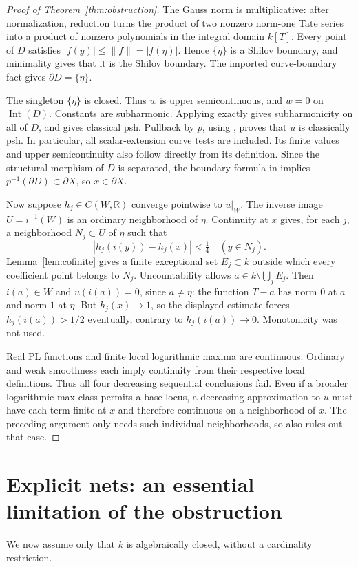 \documentclass[11pt]{article}
\newcommand{\Int}{\operatorname{Int}}
\begin{document}
\begin{proof}[Proof of Theorem~\ref{thm:obstruction}]
The Gauss norm is multiplicative: after normalization, reduction turns
the product of two nonzero norm-one Tate series into a product of nonzero
polynomials in the integral domain $k[T]$. Every point of $D$ satisfies
$|f(y)|\le\|f\|=|f(\eta)|$. Hence $\{\eta\}$ is a Shilov boundary,
and minimality gives that it is the Shilov boundary. The imported
curve-boundary fact gives $\partial D=\{\eta\}$.

The singleton $\{\eta\}$ is closed. Thus $w$ is upper semicontinuous,
and $w=0$ on $\Int(D)$. Constants are subharmonic. Applying exactly
\cite[Proposition~3.5(3)]{GR} gives subharmonicity on all of $D$, and
\cite[\S4.1.2]{GR} gives classical psh. Pullback by $p$, using
\cite[Proposition~4.2(6)]{GR}, proves that $u$ is classically psh. In
particular, all scalar-extension curve tests are included. Its finite
values and upper semicontinuity also follow directly from its definition.
Since the structural morphism of $D$ is separated, the boundary formula
in \cite[\S2.11(4)]{GR} implies $p^{-1}(\partial D)\subset\partial X$,
so $x\in\partial X$.

Now suppose $h_j\in C(W,\mathbb R)$ converge pointwise to $u|_W$.
The inverse image $U=i^{-1}(W)$ is an ordinary neighborhood of $\eta$.
Continuity at $x$ gives, for each $j$, a neighborhood $N_j\subset U$
of $\eta$ such that
\[
|h_j(i(y))-h_j(x)|<\tfrac14\quad(y\in N_j).
\]
Lemma~\ref{lem:cofinite} gives a finite exceptional set $E_j\subset k$
outside which every coefficient point belongs to $N_j$. Uncountability
allows $a\in k\setminus\bigcup_jE_j$. Then $i(a)\in W$ and
$u(i(a))=0$, since $a\ne\eta$: the function $T-a$ has norm $0$ at
$a$ and norm $1$ at $\eta$. But $h_j(x)\to1$, so the displayed estimate
forces $h_j(i(a))>1/2$ eventually, contrary to $h_j(i(a))\to0$.
Monotonicity was not used.

Real PL functions and finite local logarithmic maxima are continuous.
Ordinary and weak smoothness each imply continuity from their respective
local definitions. Thus all four decreasing sequential conclusions fail.
Even if a broader logarithmic-max class permits a base locus, a
decreasing approximation to $u$ must have each term finite at $x$ and
therefore continuous on a neighborhood of $x$. The preceding argument
only needs such individual neighborhoods, so also rules out that case.
\end{proof}

\section{Explicit nets: an essential limitation of the obstruction}
We now assume only that $k$ is algebraically closed, without a
cardinality restriction.
\end{document}
